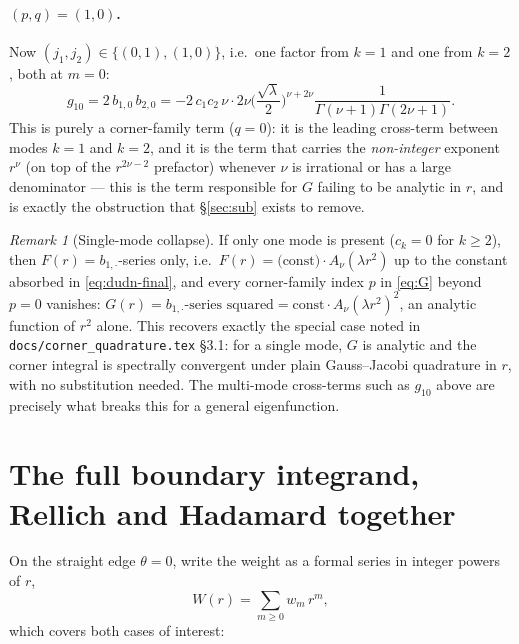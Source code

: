 \documentclass[11pt]{article}
\theoremstyle{remark}
\newtheorem{remark}{Remark}
\newcommand{\code}[1]{\texttt{#1}}
\begin{document}
\paragraph{$(p,q)=(1,0)$.} Now $(j_1,j_2)\in\{(0,1),(1,0)\}$, i.e.\ one factor from $k=1$ and one
from $k=2$, both at $m=0$:
\[
  g_{10} = 2\,b_{1,0}\,b_{2,0}
  = -2\,c_1 c_2\,\nu\cdot2\nu\Big(\frac{\sqrt\lambda}2\Big)^{\nu+2\nu}\!
    \frac{1}{\Gamma(\nu+1)\Gamma(2\nu+1)}.
\]
This is purely a corner-family term ($q=0$): it is the leading cross-term between modes $k=1$ and
$k=2$, and it is the term that carries the \emph{non-integer} exponent $r^\nu$ (on top of the
$r^{2\nu-2}$ prefactor) whenever $\nu$ is irrational or has a large denominator --- this is the
term responsible for $G$ failing to be analytic in $r$, and is exactly the obstruction that
\S\ref{sec:sub} exists to remove.

\begin{remark}[Single-mode collapse]\label{rmk:single-mode}
If only one mode is present ($c_k=0$ for $k\ge2$), then $F(r)=b_{1,\cdot}$-series only, i.e.\
$F(r) = \big(\text{const}\big)\cdot A_\nu(\lambda r^2)$ up to the constant absorbed in
\eqref{eq:dudn-final}, and every corner-family index $p$ in \eqref{eq:G} beyond $p=0$ vanishes:
$G(r)=b_{1,\cdot}\text{-series squared} = \text{const}\cdot A_\nu(\lambda r^2)^2$, an analytic
function of $r^2$ alone. This recovers exactly the special case noted in
\code{docs/corner\_quadrature.tex} \S3.1: for a single mode, $G$ is analytic and the corner
integral is spectrally convergent under plain Gauss--Jacobi quadrature in $r$, with no
substitution needed. The multi-mode cross-terms such as $g_{10}$ above are precisely what breaks
this for a general eigenfunction.
\end{remark}

\section{The full boundary integrand, Rellich and Hadamard together}\label{sec:integrand}

On the straight edge $\theta=0$, write the weight as a formal series in integer powers of $r$,
\begin{equation}\label{eq:weight}
  W(r) = \sum_{m\ge0} w_m\, r^m,
\end{equation}
which covers both cases of interest:
\end{document}
